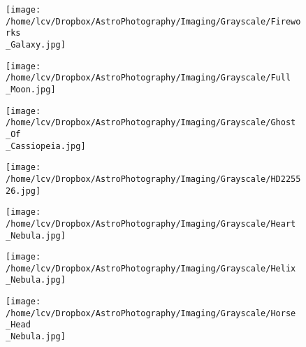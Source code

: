\newpage
\begin{figure}[phbt]
	\texttt{[image: /home/lcv/Dropbox/AstroPhotography/Imaging/Grayscale/Fireworks\\\_Galaxy.jpg]}


\end{figure}
\newpage
\begin{figure}[phbt]
	\texttt{[image: /home/lcv/Dropbox/AstroPhotography/Imaging/Grayscale/Full\\\_Moon.jpg]}


\end{figure}
\newpage
\begin{figure}[phbt]
	\texttt{[image: /home/lcv/Dropbox/AstroPhotography/Imaging/Grayscale/Ghost\\\_Of\\\_Cassiopeia.jpg]}


\end{figure}
\newpage
\begin{figure}[phbt]
	\texttt{[image: /home/lcv/Dropbox/AstroPhotography/Imaging/Grayscale/HD225526.jpg]}


\end{figure}
\newpage
\begin{figure}[phbt]
	\texttt{[image: /home/lcv/Dropbox/AstroPhotography/Imaging/Grayscale/Heart\\\_Nebula.jpg]}


\end{figure}
\newpage
\begin{figure}[phbt]
	\texttt{[image: /home/lcv/Dropbox/AstroPhotography/Imaging/Grayscale/Helix\\\_Nebula.jpg]}


\end{figure}
\newpage
\begin{figure}[phbt]
	\texttt{[image: /home/lcv/Dropbox/AstroPhotography/Imaging/Grayscale/Horse\\\_Head\\\_Nebula.jpg]}


\end{figure}
